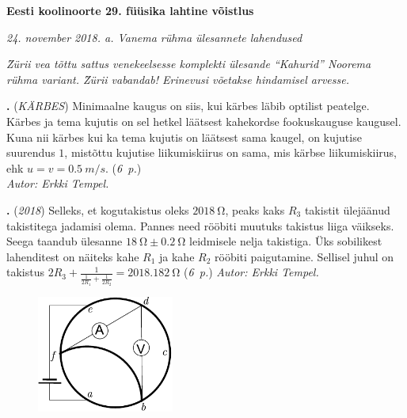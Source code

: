 \documentclass[12pt,a5paper]{article}
\newcommand{\numb}[1]{\vspace{5pt}\textbf{\large #1}}
\newcommand{\nimi}[1]{(\textsl{\small #1})}
\newcommand{\punktid}[1]{(\emph{#1~p.})}
\newcommand{\autor}[1]{\emph{ Autor: #1.}}
\newcounter{ylesanne}
\newcommand{\yl}[1]{\addtocounter{ylesanne}{1}\numb{\theylesanne.} \nimi{#1} \newblock{}}
\begin{document}
\begin{center}
\textbf{\large Eesti koolinoorte 29. füüsika lahtine võistlus} \vspace{3pt}

\emph{24. november 2018. a. Vanema rühma ülesannete lahendused}
\end{center}

\textit{\u Zürii vea tõttu sattus venekeelsesse komplekti ülesande ``Kahurid'' Noorema rühma variant. \u Zürii vabandab! Erinevusi võetakse hindamisel arvesse.}  


\yl{KÄRBES}
Minimaalne kaugus on siis, kui kärbes läbib optilist peatelge. Kärbes ja tema kujutis on sel hetkel läätsest kahekordse fookuskauguse kaugusel. Kuna nii kärbes kui ka tema kujutis on läätsest sama kaugel, on kujutise suurendus $1$, mistõttu kujutise liikumiskiirus on sama, mis kärbse liikumiskiirus, ehk $u = v = \SI{0,5}{m/s}$.
\punktid{6}\\\autor{Erkki Tempel}



\yl{2018}
Selleks, et kogutakistus oleks $\SI{2018}{\ohm}$, peaks kaks $R_3$ takistit ülejäänud takistitega jadamisi olema. Pannes need rööbiti muutuks takistus liiga väikseks. Seega taandub ülesanne $\SI{18}{\ohm}\pm\SI{0.2}{\ohm}$ leidmisele nelja takistiga. Üks sobilikest lahenditest on näiteks kahe $R_1$ ja kahe $R_2$ rööbiti paigutamine. Sellisel juhul on takistus $2R_3 + \frac{1}{\frac{1}{2R_1} + \frac{1}{2R_2}} = \SI{2018.182}{\ohm}$
\punktid{6}\autor{Erkki Tempel}



\begin{figure}
	\vspace{-30pt}
	\begin{center}
		\includegraphics[width = 0.4\textwidth]{ring.pdf}
	\end{center}
\end{figure}
\end{document}
